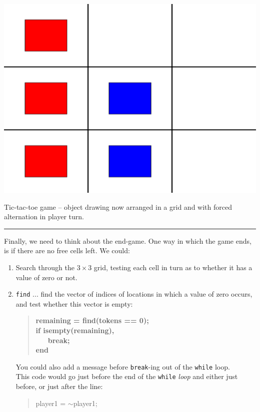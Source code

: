 \documentclass{tufte-book} %
\newenvironment{docspec}{\begin{quotation}\ttfamily\parskip0pt\parindent0pt\ignorespaces}{\end{quotation}}
\newenvironment{docspecbold}{\begin{quotation}\ttfamily\bfseries\parskip0pt\parindent0pt\ignorespaces}{\end{quotation}}
\begin{document}
\begin{marginfigure}[0.0in]
\includegraphics[width=\linewidth]{ch6-game5.eps}
\caption{Tic-tac-toe game -- object drawing now arranged in a grid and with forced alternation in player turn.}
\label{fig:ch6-game5}
\end{marginfigure}

\vspace{1mm}
\noindent\rule{4cm}{0.5pt}
\vspace{2mm}

\noindent Finally,  we need to think about the end-game. One way in which the game ends, is if there are no free cells left. We could:

\begin{enumerate}[noitemsep]
\item Search through the \(3\times 3\) grid, testing each cell in turn as to whether it has a value of zero or not.
\item \texttt{find} ... find the vector of indices of locations in which a value of zero occurs, and test whether this vector is empty:
\begin{docspecbold}
remaining = find(tokens == 0);\\
if isempty(remaining),\\
\ \ \         break;\\
end
\end{docspecbold}
You could also add a message before \texttt{break}-ing out of the \texttt{while} loop.
\\This code would go just before the end of the \texttt{while} \textit{loop} and either just before, or just after the line:
\begin{docspec}
player1 = \(\sim\)player1;
\end{docspec}
\end{enumerate}
\vspace{-2mm}
\end{document}
